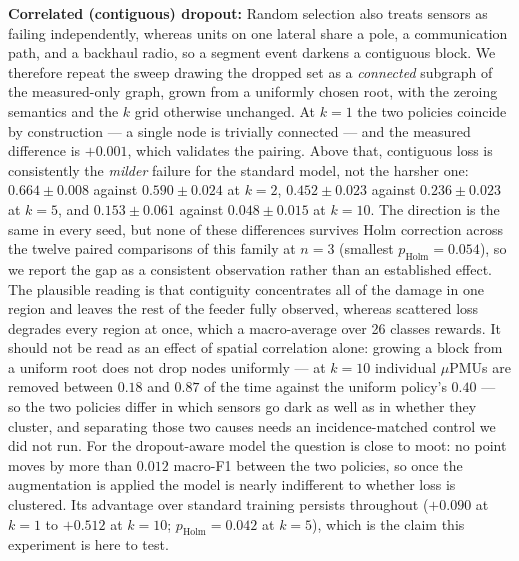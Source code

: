 \documentclass[3p,times,procedia]{elsarticle}
\begin{document}
\textbf{Correlated (contiguous) dropout:} Random selection also treats sensors as failing independently, whereas units on one lateral share a pole, a communication path, and a backhaul radio, so a segment event darkens a contiguous block. We therefore repeat the sweep drawing the dropped set as a \emph{connected} subgraph of the measured-only graph, grown from a uniformly chosen root, with the zeroing semantics and the $k$ grid otherwise unchanged. At $k=1$ the two policies coincide by construction --- a single node is trivially connected --- and the measured difference is $+0.001$, which validates the pairing. Above that, contiguous loss is consistently the \emph{milder} failure for the standard model, not the harsher one: $0.664\pm0.008$ against $0.590\pm0.024$ at $k=2$, $0.452\pm0.023$ against $0.236\pm0.023$ at $k=5$, and $0.153\pm0.061$ against $0.048\pm0.015$ at $k=10$. The direction is the same in every seed, but none of these differences survives Holm correction across the twelve paired comparisons of this family at $n=3$ (smallest $p_{\text{Holm}}=0.054$), so we report the gap as a consistent observation rather than an established effect. The plausible reading is that contiguity concentrates all of the damage in one region and leaves the rest of the feeder fully observed, whereas scattered loss degrades every region at once, which a macro-average over 26 classes rewards. It should not be read as an effect of spatial correlation alone: growing a block from a uniform root does not drop nodes uniformly --- at $k=10$ individual $\mu$PMUs are removed between $0.18$ and $0.87$ of the time against the uniform policy's $0.40$ --- so the two policies differ in which sensors go dark as well as in whether they cluster, and separating those two causes needs an incidence-matched control we did not run. For the dropout-aware model the question is close to moot: no point moves by more than $0.012$ macro-F1 between the two policies, so once the augmentation is applied the model is nearly indifferent to whether loss is clustered. Its advantage over standard training persists throughout ($+0.090$ at $k=1$ to $+0.512$ at $k=10$; $p_{\text{Holm}}=0.042$ at $k=5$), which is the claim this experiment is here to test.
\end{document}
